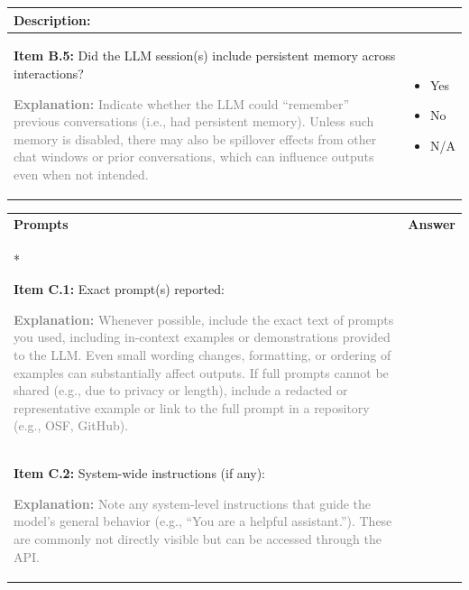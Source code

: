 \documentclass[12pt]{article}
\newcommand{\unchecked}{\ding{111}} %
\begin{document}
\begin{longtable}{|p{}|p{}|}
Description: \\
\hline
\textbf{Item B.5:} Did the LLM session(s) include persistent memory across interactions? 

\textcolor{gray}{{\footnotesize
\textbf{Explanation:} Indicate whether the LLM could “remember” previous conversations (i.e., had persistent memory). Unless such memory is disabled, there may also be spillover effects from other chat windows or prior conversations, which can influence outputs even when not intended. }}  &   \begin{itemize}[leftmargin=*]\setlength{\itemsep}{0pt}\setlength{\parskip}{0pt}
    \item[\unchecked] Yes
    \item[\unchecked] No
    \item[\unchecked] N/A
\end{itemize} \\
\hline
\end{longtable}

\begin{longtable}{|p{}|p{}|}
\hline
\rowcolor{green!20}
\textbf{{Prompts}} & \textbf{Answer} \\*   %
\hline

\textbf{Item C.1:} Exact prompt(s) reported: 

\textcolor{gray}{{\footnotesize
\textbf{Explanation:} Whenever possible, include the exact text of prompts you used, including in-context examples or demonstrations provided to the LLM. Even small wording changes, formatting, or ordering of examples can substantially affect outputs. If full prompts cannot be shared (e.g., due to privacy or length), include a redacted or representative example or link to the full prompt in a repository (e.g., OSF, GitHub). }}
&   \\
\hline
\textbf{Item C.2:} System-wide instructions (if any):

\textcolor{gray}{{\footnotesize
\textbf{Explanation:} Note any system-level instructions that guide the model’s general behavior (e.g., “You are a helpful assistant.”). These are commonly not directly visible but can be accessed through the API.
}}  &   \\
\hline
\end{longtable}
\end{document}
